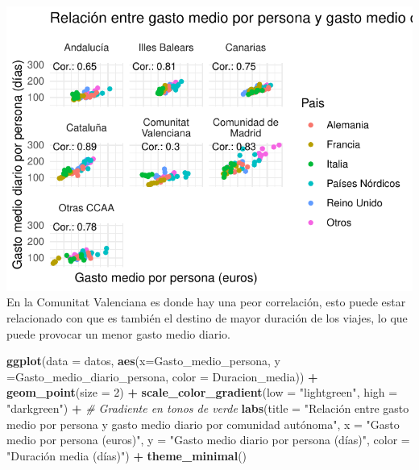 \documentclass[data,article,submit,moreauthors,pdftex]{Definitions/mdpi}
\newenvironment{Shaded}{\begin{snugshade}}{\end{snugshade}}
\newcommand{\AttributeTok}[1]{\textcolor[rgb]{0.13,0.29,0.53}{#1}}
\newcommand{\CommentTok}[1]{\textcolor[rgb]{0.56,0.35,0.01}{\textit{#1}}}
\newcommand{\DecValTok}[1]{\textcolor[rgb]{0.00,0.00,0.81}{#1}}
\newcommand{\FunctionTok}[1]{\textcolor[rgb]{0.13,0.29,0.53}{\textbf{#1}}}
\newcommand{\NormalTok}[1]{#1}
\newcommand{\SpecialCharTok}[1]{\textcolor[rgb]{0.81,0.36,0.00}{\textbf{#1}}}
\newcommand{\StringTok}[1]{\textcolor[rgb]{0.31,0.60,0.02}{#1}}
\begin{document}
\includegraphics{ProyectoAED2024_Rmd_files/figure-latex/unnamed-chunk-29-1.pdf}
En la Comunitat Valenciana es donde hay una peor correlación, esto puede
estar relacionado con que es también el destino de mayor duración de los
viajes, lo que puede provocar un menor gasto medio diario.

\begin{Shaded}
\begin{Highlighting}[]
\FunctionTok{ggplot}\NormalTok{(}\AttributeTok{data =}\NormalTok{ datos, }\FunctionTok{aes}\NormalTok{(}\AttributeTok{x=}\NormalTok{Gasto\_medio\_persona, }\AttributeTok{y =}\NormalTok{Gasto\_medio\_diario\_persona, }\AttributeTok{color =}\NormalTok{ Duracion\_media)) }\SpecialCharTok{+} \FunctionTok{geom\_point}\NormalTok{(}\AttributeTok{size =} \DecValTok{2}\NormalTok{)  }\SpecialCharTok{+} \FunctionTok{scale\_color\_gradient}\NormalTok{(}\AttributeTok{low =} \StringTok{"lightgreen"}\NormalTok{, }\AttributeTok{high =} \StringTok{"darkgreen"}\NormalTok{) }\SpecialCharTok{+}  \CommentTok{\# Gradiente en tonos de verde}
  \FunctionTok{labs}\NormalTok{(}\AttributeTok{title =} \StringTok{"Relación entre gasto medio por persona y gasto medio diario por comunidad autónoma"}\NormalTok{,}
       \AttributeTok{x =} \StringTok{"Gasto medio por persona (euros)"}\NormalTok{,}
       \AttributeTok{y =} \StringTok{"Gasto medio diario por persona (días)"}\NormalTok{,}
       \AttributeTok{color =} \StringTok{"Duración media (días)"}\NormalTok{) }\SpecialCharTok{+} \FunctionTok{theme\_minimal}\NormalTok{() }
\end{Highlighting}
\end{Shaded}
\end{document}
